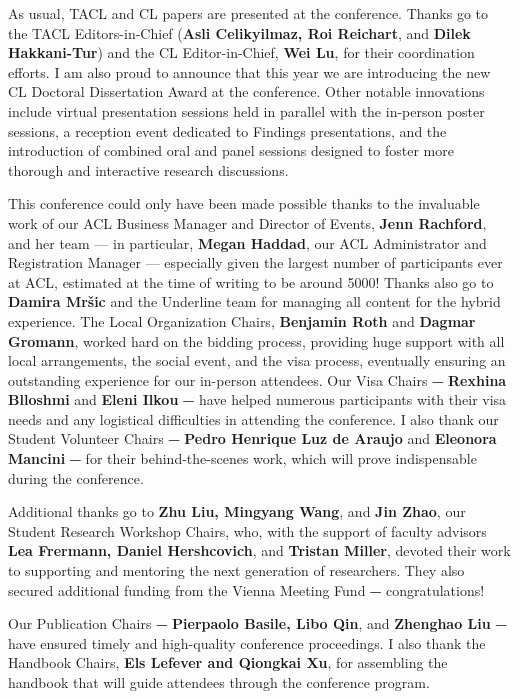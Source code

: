 As usual, TACL and CL papers are presented at the conference. Thanks go to the TACL Editors-in-Chief (\textbf{Asli Celikyilmaz, Roi Reichart}, and \textbf{Dilek Hakkani-Tur}) and the CL Editor-in-Chief, \textbf{Wei Lu}, for their coordination efforts. I am also proud to announce that this year we are introducing the new CL Doctoral Dissertation Award at the conference. Other notable innovations include virtual presentation sessions held in parallel with the in-person poster sessions, a reception event dedicated to Findings presentations, and the introduction of combined oral and panel sessions designed to foster more thorough and interactive research discussions.

This conference could only have been made possible thanks to the invaluable work of our ACL Business Manager and Director of Events, \textbf{Jenn Rachford}, and her team — in particular, \textbf{Megan Haddad}, our ACL Administrator and Registration Manager — especially given the largest number of participants ever at ACL, estimated at the time of writing to be around 5000! Thanks also go to \textbf{Damira Mršic} and the Underline team for managing all content for the hybrid experience. The Local Organization Chairs, \textbf{Benjamin Roth} and \textbf{Dagmar Gromann}, worked hard on the bidding process, providing huge support with all local arrangements, the social event, and the visa process, eventually ensuring an outstanding experience for our in-person attendees. Our Visa Chairs ⏤ \textbf{Rexhina Blloshmi} and \textbf{Eleni Ilkou} ⏤ have helped numerous participants with their visa needs and any logistical difficulties in attending the conference. I also thank our Student Volunteer Chairs ⏤ \textbf{Pedro Henrique Luz de Araujo} and \textbf{Eleonora Mancini} ⏤ for their behind-the-scenes work, which will prove indispensable during the conference. 

Additional thanks go to \textbf{Zhu Liu, Mingyang Wang}, and \textbf{Jin Zhao}, our Student Research Workshop Chairs, who, with the support of faculty advisors \textbf{Lea Frermann, Daniel Hershcovich}, and \textbf{Tristan Miller}, devoted their work to supporting and mentoring the next generation of researchers. They also secured additional funding from the Vienna Meeting Fund ⏤ congratulations!

Our Publication Chairs ⏤ \textbf{Pierpaolo Basile, Libo Qin}, and \textbf{Zhenghao Liu} ⏤ have ensured timely and high-quality conference proceedings. I also thank the Handbook Chairs, \textbf{Els Lefever and Qiongkai Xu}, for assembling the handbook that will guide attendees through the conference program.

